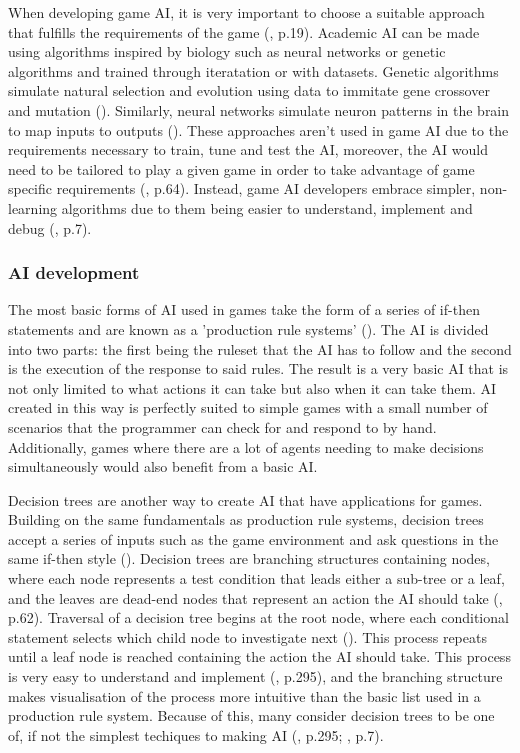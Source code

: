 \documentclass[10pt]{article}
\begin{document}
When developing game AI, it is very important to choose a suitable approach that fulfills the requirements of the game (\cite{millington2019ai}, p.19). Academic AI can be made using algorithms inspired by biology such as neural networks or genetic algorithms and trained through iteratation or with datasets. Genetic algorithms simulate natural selection and evolution using data to immitate gene crossover and mutation (\cite{tozour2002evolution}). Similarly, neural networks simulate neuron patterns in the brain to map inputs to outputs (\cite{tozour2002evolution}). These approaches aren't used in game AI due to the requirements necessary to train, tune and test the AI, moreover, the AI would need to be tailored to play a given game in order to take advantage of game specific requirements (\cite{nareyek2004ai}, p.64). Instead, game AI developers embrace simpler, non-learning algorithms due to them being easier to understand, implement and debug (\cite{tozour2002evolution}, p.7).

\subsubsection{AI development}

The most basic forms of AI used in games take the form of a series of if-then statements and are known as a 'production rule systems' (\cite{tozour2002evolution}). The AI is divided into two parts: the first being the ruleset that the AI has to follow and the second is the execution of the response to said rules. The result is a very basic AI that is not only limited to what actions it can take but also when it can take them. AI created in this way is perfectly suited to simple games with a small number of scenarios that the programmer can check for and respond to by hand. Additionally, games where there are a lot of agents needing to make decisions simultaneously would also benefit from a basic AI.

Decision trees are another way to create AI that have applications for games. Building on the same fundamentals as production rule systems, decision trees accept a series of inputs such as the game environment and ask questions in the same if-then style (\cite{tozour2002evolution}). Decision trees are branching structures containing nodes, where each node represents a test condition that leads either a sub-tree or a leaf, and the leaves are dead-end nodes that represent an action the AI should take (\cite{nareyek2004ai}, p.62). Traversal of a decision tree begins at the root node, where each conditional statement selects which child node to investigate next (\cite{nareyek2004ai}). This process repeats until a leaf node is reached containing the action the AI should take. This process is very easy to understand and implement (\cite{millington2019ai}, p.295), and the branching structure makes visualisation of the process more intuitive than the basic list used in a production rule system. Because of this, many consider decision trees to be one of, if not the simplest techiques to making AI (\cite{millington2019ai}, p.295; \cite{tozour2002evolution}, p.7).
\end{document}
